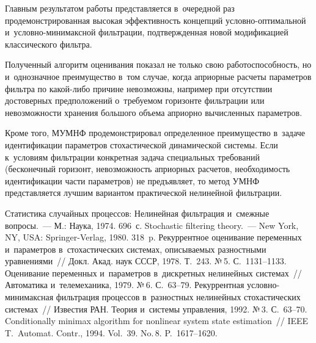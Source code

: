 \begin{multicols}{2}
    Главным результатом работы представляется в~очередной раз 
продемонстрированная высокая эффективность концепций 
услов\-но-оп\-ти\-маль\-ной и~услов\-но-ми\-ни\-макс\-ной фильтрации, подтвержденная новой 
модификацией классического фильтра. 

Полученный алгоритм оценивания 
показал не только свою работоспособность, но и~однозначное преимущество 
в~том случае, когда априорные расчеты параметров фильтра по  
ка\-кой-ли\-бо причине невозможны, например при отсутствии достоверных 
предположений о~требуемом горизонте фильт\-ра\-ции или невозможности 
хранения большого объема априорно вычисленных па\-ра\-мет\-ров. 

Кроме того, 
МУМНФ продемонстрировал опреде\-ленное преимущество в~задаче 
идентификации па\-ра\-мет\-ров стохастической динамической сис\-те\-мы. Если 
к~условиям фильтрации конкретная за\-да\-ча специальных требований 
(бесконечный горизонт, невозможность априорных расчетов, необходимость 
идентификации части параметров) не предъявляет, то метод УМНФ 
представляется лучшим вариантом практической нелинейной фильт\-рации.
    
    {\small\frenchspacing
 {%
 \begin{thebibliography}{99}

 Статистика случайных процессов: Нелинейная 
фильтрация и~смежные вопросы.~--- М.: Наука, 1974. 696~с.
 Stochastic filtering theory.~--- New York, NY, USA: Springer-Verlag, 1980. 
318~p.
 Рекуррентное оценивание переменных и~параметров в~стохастических 
системах, опи\-сы\-ва\-емых разностными уравнениями~// Докл. Акад. наук СССР, 1978. Т.~243. №\,5.  
С.~1131--1133.
 Оценивание переменных и~параметров в~дискретных нелинейных 
системах~// Автоматика и~телемеханика, 1979. №\,6. С.~63--79.
 Рекуррентная услов\-но-ми\-ни\-макс\-ная фильтрация процессов 
в~разностных нелинейных стохастических системах~// Известия РАН. Теория и~системы 
управления, 1992. №\,3. С.~63--70.
 Conditionally minimax algorithm for nonlinear system state 
estimation~// IEEE T.~Automat. Contr., 1994. Vol.~39. No.\,8. P.~1617--1620.


\end{thebibliography}}}
\end{multicols}
